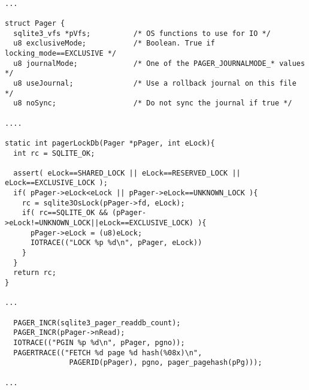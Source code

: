 \begin{lstlisting}

...

struct Pager {
  sqlite3_vfs *pVfs;          /* OS functions to use for IO */
  u8 exclusiveMode;           /* Boolean. True if locking_mode==EXCLUSIVE */
  u8 journalMode;             /* One of the PAGER_JOURNALMODE_* values */
  u8 useJournal;              /* Use a rollback journal on this file */
  u8 noSync;                  /* Do not sync the journal if true */

....

static int pagerLockDb(Pager *pPager, int eLock){
  int rc = SQLITE_OK;

  assert( eLock==SHARED_LOCK || eLock==RESERVED_LOCK || eLock==EXCLUSIVE_LOCK );
  if( pPager->eLock<eLock || pPager->eLock==UNKNOWN_LOCK ){
    rc = sqlite3OsLock(pPager->fd, eLock);
    if( rc==SQLITE_OK && (pPager->eLock!=UNKNOWN_LOCK||eLock==EXCLUSIVE_LOCK) ){
      pPager->eLock = (u8)eLock;
      IOTRACE(("LOCK %p %d\n", pPager, eLock))
    }
  }
  return rc;
}

...

  PAGER_INCR(sqlite3_pager_readdb_count);
  PAGER_INCR(pPager->nRead);
  IOTRACE(("PGIN %p %d\n", pPager, pgno));
  PAGERTRACE(("FETCH %d page %d hash(%08x)\n",
               PAGERID(pPager), pgno, pager_pagehash(pPg)));

...

\end{lstlisting}

